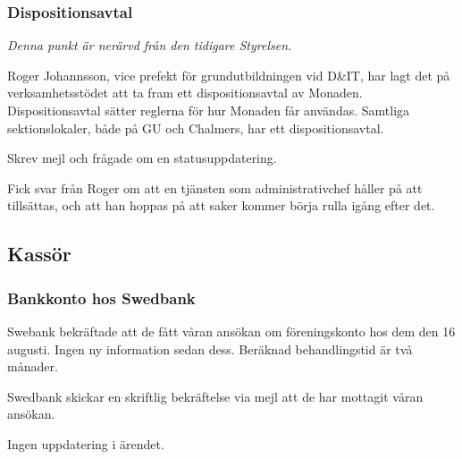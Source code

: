 \documentclass[protokoll]{dvd}
\begin{document}
\subsubsection{Dispositionsavtal}

\emph{Denna punkt är nerärvd från den tidigare Styrelsen.}

Roger Johannsson, vice prefekt för grundutbildningen vid D\&IT, har lagt det på verksamhetsstödet att ta fram ett dispositionsavtal av Monaden.
Dispositionsavtal sätter reglerna för hur Monaden får användas.
Samtliga sektionslokaler, både på GU och Chalmers, har ett dispositionsavtal.

\begin{description}[style=multiline, widest=00.00, align=left, leftmargin=2.5cm]
    \item[2021-09-20] Skrev mejl och frågade om en statusuppdatering.

    \item[2021-09-21] Fick svar från Roger om att en tjänsten som administrativchef håller på att tillsättas, och att han hoppas på att saker kommer börja rulla igång efter det.
\end{description}


\subsection{Kassör}

\subsubsection{Bankkonto hos Swedbank}

Swebank bekräftade att de fått våran ansökan om föreningskonto hos dem den 16 augusti.
Ingen ny information sedan dess.
Beräknad behandlingstid är två månader.

\begin{description}[style=multiline, widest=00.00, align=left, leftmargin=2.5cm]
    \item[2021-08-16] Swedbank skickar en skriftlig bekräftelse via mejl att de har mottagit våran ansökan.

    \item[2021-09-21] Ingen uppdatering i ärendet.
\end{description}
\end{document}
